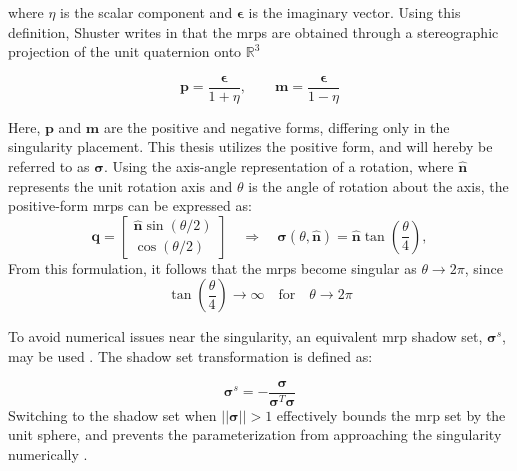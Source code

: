 where $\eta$ is the scalar component and $\boldsymbol{\epsilon}$ is the imaginary vector. Using this definition, Shuster writes in \cite{shuster1993survey} that the \gls{mrp}s are obtained through a stereographic projection of the unit quaternion onto $\mathbb{R}^{3}$

\begin{equation}
    \textbf{p} = \frac{\boldsymbol{\epsilon}}{1 + \eta}, \qquad 
    \textbf{m} = \frac{\boldsymbol{\epsilon}}{1 - \eta}
\end{equation}

Here, $\textbf{p}$ and $\textbf{m}$ are the positive and negative forms, differing only in the singularity placement. This thesis utilizes the positive form, and will hereby be referred to as $\boldsymbol{\sigma}$. Using the axis-angle representation of a rotation, where $\hat{\textbf{n}}$ represents the unit rotation axis and $\theta$ is the angle of rotation about the axis, the positive-form \gls{mrp}s can be expressed as:
\begin{equation}
    \textbf{q} = \begin{bmatrix}
        \hat{\textbf{n}}\sin(\theta/2) \\
        \cos(\theta/2)         
    \end{bmatrix} \quad \Rightarrow \quad \boldsymbol{\sigma}(\theta, \hat{\textbf{n}}) = \hat{\textbf{n}}\tan\left(\frac{\theta}{4}\right),
\end{equation}
From this formulation, it follows that the \gls{mrp}s become singular as $\theta \rightarrow 2\pi$, since
\begin{equation}
    \tan \left( \frac{\theta}{4}\right) \rightarrow \infty \quad \text{for} \quad \theta \rightarrow 2\pi 
\end{equation}

To avoid numerical issues near the singularity, an equivalent \gls{mrp} shadow set, $\boldsymbol{\sigma}^s$, may be used \cite{okeefe2014shadow}. The shadow set transformation is defined as:

\begin{equation}
    \boldsymbol{\sigma}^s = -\frac{\boldsymbol{\sigma}}{\boldsymbol{\sigma}^T \boldsymbol{\sigma}}
\end{equation}
Switching to the shadow set when $||\boldsymbol{\sigma}|| > 1$ effectively bounds the \gls{mrp} set by the unit sphere, and prevents the parameterization from approaching the singularity numerically \cite{marandi1987preferred, okeefe2014shadow, shuster1993survey}.

